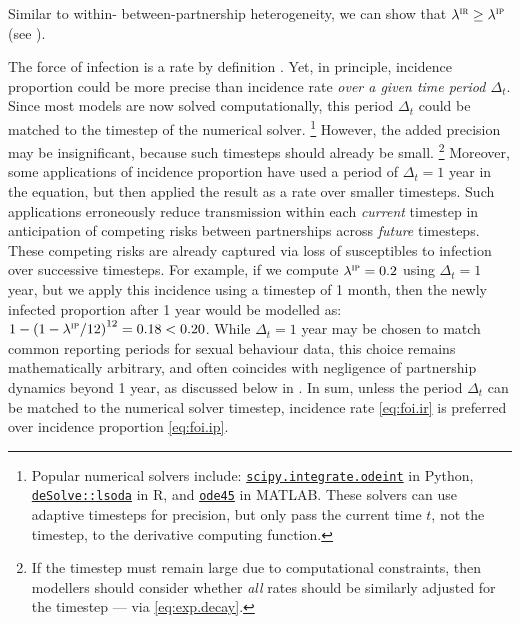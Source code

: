Similar to within- \vs between-partnership heterogeneity,
we can show that $\lambda^\textsc{ir} \ge \lambda^\textsc{ip}$ (see ).
\par
The force of infection is a rate by definition \cite{Anderson1991}.
Yet, in principle, incidence proportion could be more precise than incidence rate
\emph{over a given time period $\Delta_t$}.
Since most models are now solved computationally,
this period $\Delta_t$ could be matched to the timestep of the numerical solver.%
\footnote{\label{foot:ode}%
  Popular numerical solvers include:
  \href{https://docs.scipy.org/doc/scipy/reference/generated/scipy.integrate.odeint.html}
  {\texttt{scipy.integrate.odeint}} in Python,
  \href{https://cran.r-project.org/web/packages/deSolve/index.html}
  {\texttt{deSolve::lsoda}} in R, and
  \href{https://www.mathworks.com/help/matlab/ref/ode45.html}
  {\texttt{ode45}} in MATLAB.
  These solvers can use adaptive timesteps for precision,
  but only pass the current time $t$, not the timestep, to the derivative computing function.}
However, the added precision may be insignificant, because such timesteps should already be small.%
\footnote{If the timestep must remain large due to computational constraints, then
  modellers should consider whether \emph{all} rates should be similarly adjusted for the timestep
  --- \eg via \eqref{eq:exp.decay}.}
Moreover, some applications of incidence proportion have used
a period of $\Delta_t = 1$ year in the equation, but then
applied the result as a rate over smaller timesteps.
Such applications erroneously reduce transmission within each \emph{current} timestep
in anticipation of competing risks between partnerships across \emph{future} timesteps.
These competing risks are already captured via
loss of susceptibles to infection over successive timesteps.
For example, if we compute $\lambda^\textsc{ip} = 0.2$ using $\Delta_t = 1$ year,
but we apply this incidence using a timestep of 1 month,
then the newly infected proportion after 1 year would be modelled as:
$1 - {(1 - \lambda^\textsc{ip}/12)}^{12} = 0.18 < 0.20$.
While $\Delta_t = 1$ year may be chosen to match common reporting periods for sexual behaviour data,
this choice remains mathematically arbitrary,
and often coincides with negligence of partnership dynamics beyond 1 year,
as discussed below in .
In sum, unless the period $\Delta_t$ can be matched to the numerical solver timestep,
incidence rate \eqref{eq:foi.ir} is preferred over incidence proportion \eqref{eq:foi.ip}.
